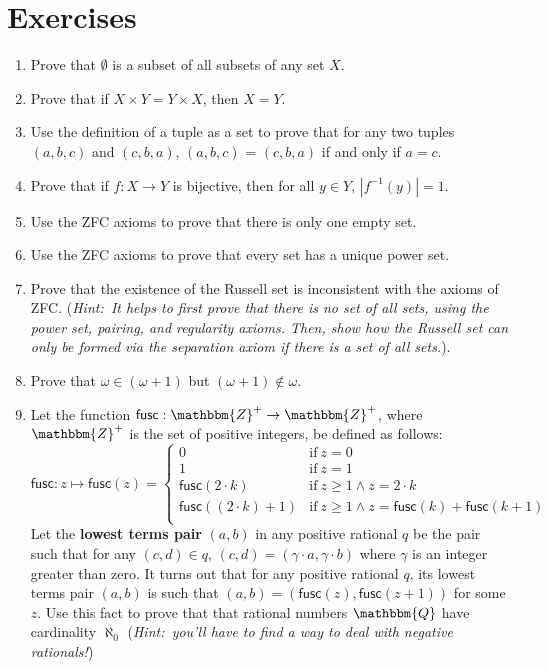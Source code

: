 \documentclass[11pt]{article}
\theoremstyle{definition}
\theoremstyle{remark}
\begin{document}
\section*{Exercises}
\begin{enumerate}
    \item Prove that $\emptyset$ is a subset of all subsets of any set $X$.

    \item Prove that if $X\times Y = Y\times X$, then $X=Y$.

    \item Use the definition of a tuple as a set to prove that for any two tuples $(a,b,c)$ and $(c,b,a)$, $(a,b,c)$ = $(c,b,a)$ if and only if $a=c$.

    \item Prove that if $f:X\rightarrow Y$ is bijective, then for all $y\in Y$, $|f^{-1}(y)|=1$. 

    \item Use the ZFC axioms to prove that there is only one empty set.

    \item Use the ZFC axioms to prove that every set has a unique power set.

    \item Prove that the existence of the Russell set is inconsistent with the axioms of ZFC. (\textit{Hint:\ It helps to first prove that there is no set of all sets, using the power set, pairing, and regularity axioms. Then, show how the Russell set can only be formed via the separation axiom if there is a set of all sets.}).

    \item Prove that $\omega\in(\omega+1)$ but $(\omega + 1)\not\in\omega$. 

    \item Let the function $\textsf{fusc}:\mathbbm{Z}^{+}\rightarrow\mathbbm{Z}^{+}$, where $\mathbbm{Z}^{+}$ is the set of positive integers, be defined as follows:
    \begin{equation*}
    \textsf{fusc}:z\mapsto \textsf{fusc}(z) = \begin{cases}
        0 & \text{if} \ z=0\\
        1 & \text{if} \ z=1\\
        \textsf{fusc}(2\cdot k) & \text{if} \ z\geq 1 \wedge z=2\cdot k\\
        \textsf{fusc}((2\cdot k)+1) & \text{if} \ z\geq 1 \wedge z=\textsf{fusc}(k) + \textsf{fusc}(k+1)\\
    \end{cases}
    \end{equation*}
        Let the \textbf{lowest terms pair} $(a,b)$ in any positive rational $q$ be the pair such that for any $(c,d)\in q$, $(c,d)=(\gamma \cdot a,\gamma \cdot b)$ where $\gamma$ is an integer greater than zero. It turns out that for any positive rational $q$, its lowest terms pair $(a,b)$ is such that $(a,b)=(\textsf{fusc}(z),\textsf{fusc}(z+1))$ for some $z$. Use this fact to prove that that rational numbers $\mathbbm{Q}$ have cardinality $\aleph_{0}$ (\textit{Hint:\ you'll have to find a way to deal with negative rationals!})
\end{enumerate}
\end{document}
